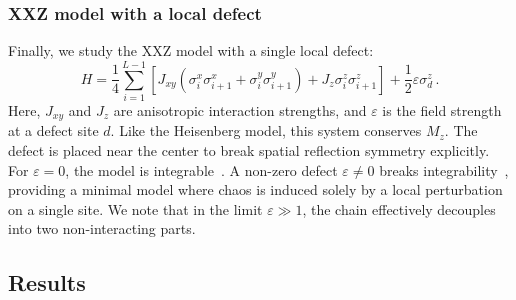 \documentclass[pra,twocolumn,aps,showpacs,superscriptaddress,longbibliography]{revtex4-2}
\newcommand{\choip}{\langle \text{Tr}[\mathcal{D}(t)^2] \rangle_{\mathrm{Haar}, t}}
\newcommand{\statep}{\overline{\mathcal{P}}}
\begin{document}
\subsubsection{XXZ model with a local defect}\label{sec:xxz}
Finally, we study the XXZ model with a single local defect:
\begin{equation}\label{eq:H:xxz}
H = \frac{1}{4}\sum_{i=1}^{L-1} \left[ J_{xy} (\sigma_i^x\sigma_{i+1}^x + \sigma_i^y\sigma_{i+1}^y) + J_z \sigma_i^z\sigma_{i+1}^z \right] + \frac{1}{2}\varepsilon \sigma_d^z \, .
\end{equation}
Here, $J_{xy}$ and $J_z$ are anisotropic interaction strengths, and $\varepsilon$ is the field strength at a defect site $d$. Like the Heisenberg model, this system conserves $M_z$. The defect is placed near the center to break spatial reflection symmetry explicitly. For $\varepsilon = 0$, the model is integrable~\cite{bethe_1931_zur}. A non-zero defect $\varepsilon \neq 0$ breaks integrability~\cite{santos_2004_integrability,brenes_2018_hightemperature,pandey_2020_adiabatic}, providing a minimal model where chaos is induced solely by a local perturbation on a single site. We note that in the limit $\varepsilon \gg 1$, the chain effectively decouples into two non-interacting parts.

\subsection{Results}\label{sec:results_discussion}

\end{document}
